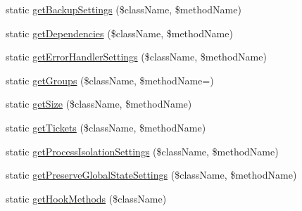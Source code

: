 \begin{DoxyCompactItemize}
\item 
static \mbox{\hyperlink{class_p_h_p_unit___util___test_a826b0e27923488caaa268009331e3f9a}{get\+Backup\+Settings}} (\$class\+Name, \$method\+Name)
\item 
static \mbox{\hyperlink{class_p_h_p_unit___util___test_a2195fde42b44d78e284334120dd800c2}{get\+Dependencies}} (\$class\+Name, \$method\+Name)
\item 
static \mbox{\hyperlink{class_p_h_p_unit___util___test_a76e935dd2c50aa597cc40cfddd3c1410}{get\+Error\+Handler\+Settings}} (\$class\+Name, \$method\+Name)
\item 
static \mbox{\hyperlink{class_p_h_p_unit___util___test_aba5e9df8130b29c3278117617d55bca6}{get\+Groups}} (\$class\+Name, \$method\+Name=\textquotesingle{}\textquotesingle{})
\item 
static \mbox{\hyperlink{class_p_h_p_unit___util___test_a31a1a1c97c8b575db6bbe40720e280a8}{get\+Size}} (\$class\+Name, \$method\+Name)
\item 
static \mbox{\hyperlink{class_p_h_p_unit___util___test_ad50f8c2943d0401b2a01abe0949dc48b}{get\+Tickets}} (\$class\+Name, \$method\+Name)
\item 
static \mbox{\hyperlink{class_p_h_p_unit___util___test_aa88a83fc430fcd1dfa1ac6c1ff72f0c1}{get\+Process\+Isolation\+Settings}} (\$class\+Name, \$method\+Name)
\item 
static \mbox{\hyperlink{class_p_h_p_unit___util___test_a81cd468af157d6d2f1a9e30119e85f14}{get\+Preserve\+Global\+State\+Settings}} (\$class\+Name, \$method\+Name)
\item 
static \mbox{\hyperlink{class_p_h_p_unit___util___test_ab4560a0a9c92206b61da8638ebaad3a3}{get\+Hook\+Methods}} (\$class\+Name)
\end{DoxyCompactItemize}
